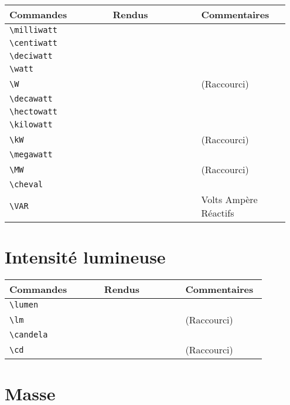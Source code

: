\documentclass[a4paper,12pt]{article}
\newcommand{\rac}{({\color{red}Raccourci})}
\begin{document}
	\noindent
	\begin{tabular}{|p{0.35\linewidth}|p{0.3\linewidth}|p{0.3\linewidth}|}
		\hline
 			\textbf{Commandes}&\textbf{Rendus}&\textbf{Commentaires}
 		\\\hline\hline
			\verb!\milliwatt!	& 	\milliwatt	&	\\
		\hline
			\verb!\centiwatt!	& 	\centiwatt	&	\\
		\hline
			\verb!\deciwatt!	& 	\deciwatt	&	\\
		\hline
			\verb!\watt!		& 	\watt		&	\\
		\hline
			\verb!\W!		& 	\W		&	\rac\\
		\hline
			\verb!\decawatt!	& 	\decawatt	&	\\
		\hline
			\verb!\hectowatt!	& 	\hectowatt	&	\\
		\hline
			\verb!\kilowatt!	& 	\kilowatt	&	\\
		\hline
			\verb!\kW!		& 	\kW		&	\rac\\
		\hline
			\verb!\megawatt!	& 	\megawatt	&	\\
		\hline
			\verb!\MW!		& 	\MW		&	\rac\\
		\hline
			\verb!\cheval!		& 	\cheval		&	\\
		\hline
			\verb!\VAR!		& 	\VAR		&	Volts Ampère Réactifs\\
		\hline
	\end{tabular}
	
	
	\section{Intensité lumineuse}

	\noindent
	\begin{tabular}{|p{0.35\linewidth}|p{0.3\linewidth}|p{0.3\linewidth}|}
		\hline
 			\textbf{Commandes}&\textbf{Rendus}&\textbf{Commentaires}
 		\\\hline\hline
			\verb!\lumen!	& 	\lumen	&	\\
		\hline
			\verb!\lm!	& 	\lm	&	\rac\\
		\hline
			\verb!\candela!	& 	\candela	&	\\
		\hline
			\verb!\cd!	& 	\cd		&	\rac\\
		\hline
	\end{tabular}
	
	
	\section{Masse}
	
\end{document}
